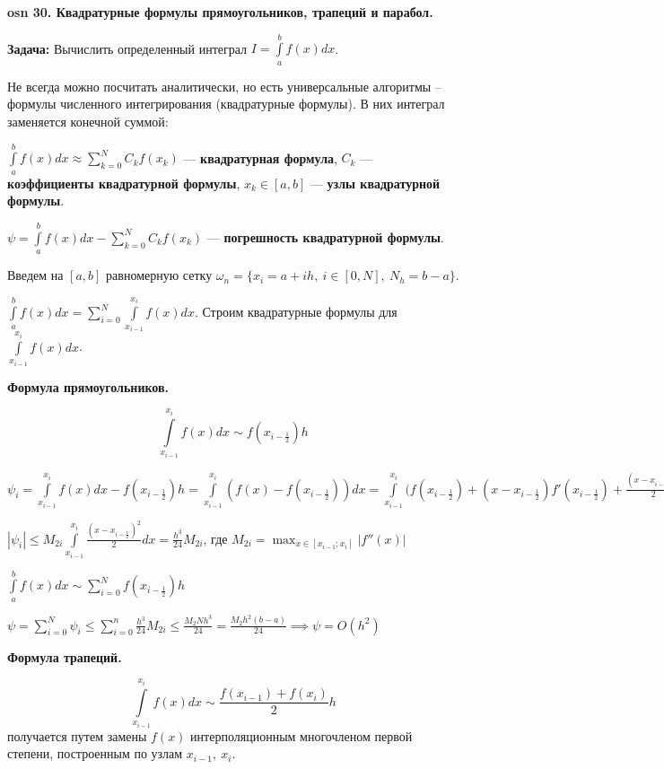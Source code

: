 \textbf{\LARGE osn 30. Квадратурные формулы прямоугольников, трапеций и парабол.}

\textbf{Задача:} Вычислить определенный интеграл $I = \int\limits_a^b f(x)dx$.

Не всегда можно посчитать аналитически, но есть универсальные алгоритмы -- формулы численного интегрирования (квадратурные формулы). 
В них интеграл заменяется конечной суммой:

$ \int\limits_a^b f(x)dx \approx\displaystyle\sum_{k=0}^N C_k f(x_k)$ --- \textbf{квадратурная формула}, 
$C_k$ --- \textbf{коэффициенты квадратурной формулы}, 
$x_k \in [a, b]$ --- \textbf{узлы квадратурной формулы}.

$\psi = \int\limits_a^b f(x)dx - \sum_{k=0}^N C_k f(x_k) $ --- \textbf{погрешность квадратурной формулы}. 

Введем на $[a,b]$ равномерную сетку $\omega_n = \{x_i =a+ih,~i\in[0,N],~N_h=b-a \}$.

$\int\limits_a^b f(x)dx = \displaystyle\sum_{i=0}^N\int\limits_{x_{i-1}}^{x_i} f(x)dx$. Строим квадратурные формулы для $\int\limits_{x_{i-1}}^{x_i} f(x)dx$.

\textbf{Формула прямоугольников.}

$$ \int\limits_{x_{i-1}}^{x_i} f(x)dx \sim f \left( x_{i-\frac{1}{2}} \right) h $$

$\psi_i = \int\limits_{x_{i-1}}^{x_i} f(x)dx - f \left( x_{i-\frac{1}{2}} \right)h = 
\int\limits_{x_{i-1}}^{x_i} \left( f(x) - f\left(x_{i-\frac{1}{2}} \right) \right)dx = 
\int\limits_{x_{i-1}}^{x_i} 
\Biggl( 
    f(x_{i-\frac{1}{2}}) + 
    (x - x_{i-\frac{1}{2}})f'(x_{i-\frac{1}{2}}) + 
    \frac{\left(x - x_{i-\frac{1}{2}}\right)^2}{2}f''(\xi) 
    \Biggr|_{\xi \in [x_{i-1};x_i]} - 
    f(x_{i-\frac{1}{2}}) 
\Biggr) dx$

$|\psi_i| \leqslant 
M_{2i} \int\limits_{x_{i-1}}^{x_i} \frac{ \left(x - x_{i-\frac{1}{2}} \right)^2}{2}dx = 
\frac{h^3}{24} M_{2i}$, где $ M_{2i} = \displaystyle\max_{x\in[x_{i-1};x_i]}|f''(x)|$

$\int\limits_a^b f(x)dx \sim \displaystyle\sum_{i=0}^N f(x_{i-\frac{1}{2}})h$

$\psi = \displaystyle\sum_{i=0}^N \psi_i \leqslant \displaystyle\sum_{i=0}^n \frac{h^3}{24} M_{2i}\leqslant \frac{M_2Nh^3}{24} = \frac{M_2h^2(b-a)}{24} \implies \psi = O(h^2)$

\textbf{Формула трапеций.}

$$ \int\limits_{x_{i-1}}^{x_i} f(x)dx \sim \frac{f(x_{i-1}) +f (x_i)}{2}h $$
получается путем замены $f(x)$ интерполяционным многочленом первой степени, построенным по узлам $x_{i-1},~x_i$.

